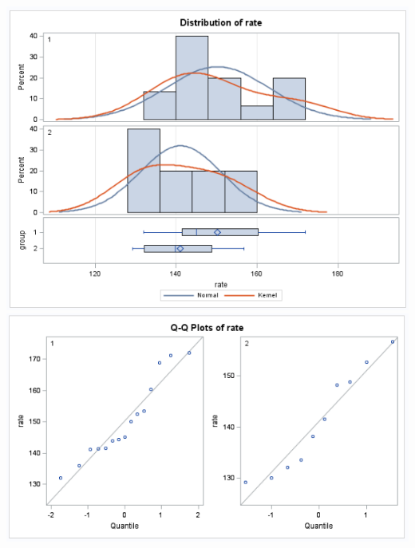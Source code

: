 \begin{center}
\includegraphics[scale=0.55	]{heartrateplot1}\includegraphics[scale=0.55]{heartrateplot2}
\end{center}

\newpage

